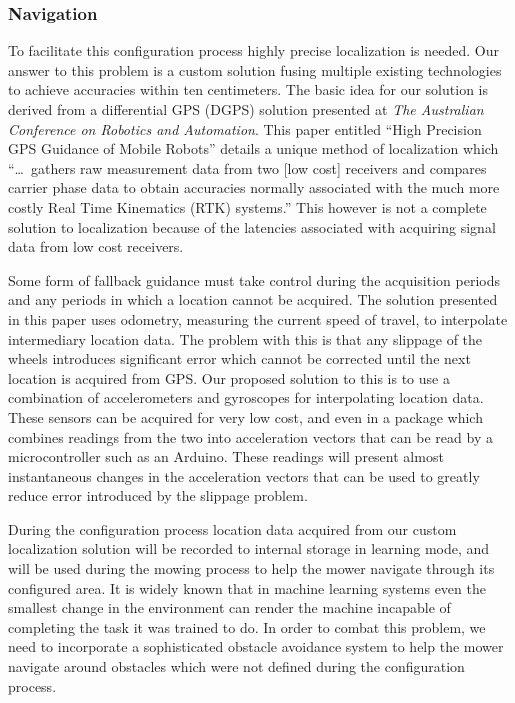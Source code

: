\documentclass[12pt,letterpaper]{article}
\begin{document}
\subsubsection{Navigation}

To facilitate this configuration process highly precise localization is needed.
Our answer to this problem is a custom solution fusing multiple existing
technologies to achieve accuracies within ten centimeters.  The basic idea for
our solution is derived from a differential GPS (DGPS) solution presented at
\textit{The Australian Conference on Robotics and Automation}.  This paper
entitled ``High Precision GPS Guidance of Mobile Robots'' details a unique
method of localization which ``\ldots\ gathers raw measurement data from two
[low cost] receivers and compares carrier phase data to obtain accuracies
normally associated with the much more costly Real Time Kinematics (RTK)
systems.''\autocite{mobilegps}  This however is not a complete solution to
localization because of the latencies associated with acquiring signal data
from low cost receivers.  

Some form of fallback guidance must take control
during the acquisition periods and any periods in which a location cannot be
acquired.  The solution presented in this paper uses odometry, measuring the
current speed of travel, to interpolate intermediary location data.  The problem
with this is that any slippage of the wheels introduces significant error
which cannot be corrected until the next location is acquired from GPS.
Our proposed solution to this is to use a combination of accelerometers and
gyroscopes for interpolating location data.  These sensors can be acquired for
very low cost, and even in a package which combines readings from the two into
acceleration vectors that can be read by a microcontroller such as an Arduino. 
These readings will present almost instantaneous changes in the acceleration vectors that can be used to greatly
reduce error introduced by the slippage problem.
  
During the configuration process location data acquired from our custom
localization solution will be recorded to internal storage in learning mode, and
will be used during the mowing process to help the mower navigate through its
configured area.  It is widely known that in machine learning systems even the
smallest change in the environment can render the machine incapable of
completing the task it was trained to do.  In order to combat this problem, we
need to incorporate a sophisticated obstacle avoidance system to help the mower
navigate around obstacles which were not defined during the configuration
process.
\end{document}
